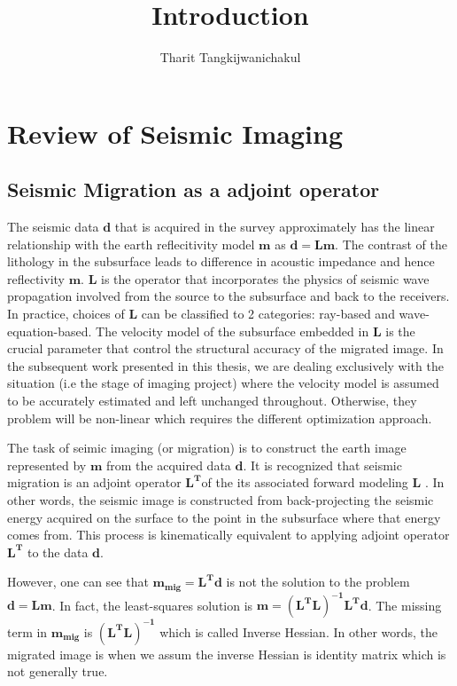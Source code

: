 \title{Introduction}
\author{Tharit Tangkijwanichakul}
\label{ch:chapter-intro}
\maketitle
{}


\section{Review of Seismic Imaging}

\subsection{Seismic Migration as a adjoint operator}

The seismic data $\mathbf{d}$ that is acquired in the survey approximately has the linear relationship with the earth reflecitivity model $\mathbf{m}$ as $\mathbf{d=Lm}$. The contrast of the lithology in the subsurface leads to difference in acoustic impedance and hence reflectivity $\mathbf{m}$. $\mathbf{L}$ is the operator that incorporates the physics of seismic wave propagation involved from the source to the subsurface and back to the receivers. In practice, choices of $\mathbf{L}$ can be classified to 2 categories: ray-based and wave-equation-based. The velocity model of the subsurface embedded in $\mathbf{L}$ is the crucial parameter that control the structural accuracy of the migrated image. In the subsequent work presented in this thesis, we are dealing exclusively with the situation (i.e the stage of imaging project) where the velocity model is assumed to be accurately estimated and left unchanged throughout. Otherwise, they problem will be non-linear which requires the different optimization approach.

The task of seimic imaging (or migration) is to construct the earth image represented by $\mathbf{m}$ from the acquired data $\mathbf{d}$. It is recognized that seismic migration is an adjoint operator $\mathbf{L^T}$of the its associated forward modeling $\mathbf{L}$ \cite[]{claerbout1992earth}. In other words, the seismic image is constructed from back-projecting the seismic energy acquired on the surface to the point in the subsurface where that energy comes from. This process is kinematically equivalent to applying adjoint operator $\mathbf{L^T}$ to the data $\mathbf{d}$.

However, one can see that $\mathbf{m_{mig} = L^{T}d}$ is not the solution to the problem $\mathbf{d=Lm}$. In fact, the least-squares solution is $\mathbf{m = (L^{T}L)^{-1} L^{T} d}$. The missing term in $\mathbf{m_{mig}}$ is $\mathbf{(L^{T}L)^{-1}}$ which is called Inverse Hessian. In other words, the migrated image is when we assum the inverse Hessian is identity matrix which is not generally true.

